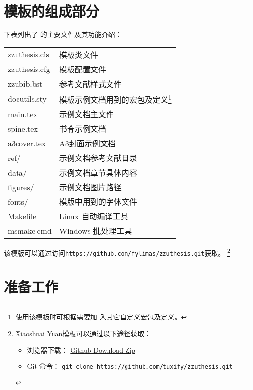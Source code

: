 \section{模板的组成部分}

下表列出了 \zzuthesis{} 的主要文件及其功能介绍：
\begin{center}
\tabletail{\hline}
  \begin{mpsupertabular}{l|p{8cm}}
zzuthesis.cls & 模板类文件\\
zzuthesis.cfg & 模板配置文件\\
zzubib.bst & 参考文献样式文件\\\hline
docutils.sty & 模板示例文档用到的宏包及定义\footnote{使用该模板时可根据需要加
入其它自定义宏包及定义。}\\ 
main.tex & 示例文档主文件\\
spine.tex & 书脊示例文档\\
a3cover.tex & A3封面示例文档\\
ref/ & 示例文档参考文献目录\\
data/ & 示例文档章节具体内容\\
figures/ & 示例文档图片路径\\
fonts/ & 模版中用到的字体文件\\\hline
Makefile & Linux 自动编译工具\\
msmake.cmd & Windows 批处理工具\\
  \end{mpsupertabular}
\end{center}

该模版可以通过访问\texttt{https://github.com/fylimas/zzuthesis.git}获取。
\footnote{
Xiaoshuai Yuan模板可以通过以下途径获取：
\begin{itemize}
\item 浏览器下载：
\href{https://codeload.github.com/tuxify/zzuthesis/zip/master}{Github Download Zip}
\item Git 命令：
\texttt{git clone https://github.com/tuxify/zzuthesis.git}
\end{itemize}
}

\section{准备工作}

